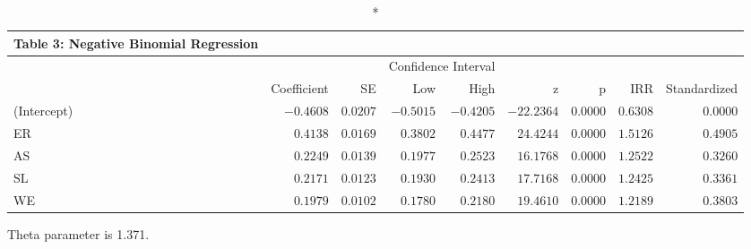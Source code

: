 \setlength{\LTpost}{0mm}
\begin{longtable}{l|rrrrrrrr}
\caption*{
{\large Table 3: Negative Binomial Regression}
} \\ 
\toprule
\multicolumn{1}{l}{} &  &  & \multicolumn{2}{c}{Confidence Interval} &  &  &  &  \\ 
\cmidrule(lr){4-5}
\multicolumn{1}{l}{} & Coefficient & SE & Low & High & z & p & IRR & Standardized \\ 
\midrule
(Intercept) & $-0.4608$ & $0.0207$ & $-0.5015$ & $-0.4205$ & $-22.2364$ & $0.0000$ & $0.6308$ & $0.0000$ \\ 
ER & $0.4138$ & $0.0169$ & $0.3802$ & $0.4477$ & $24.4244$ & $0.0000$ & $1.5126$ & $0.4905$ \\ 
AS & $0.2249$ & $0.0139$ & $0.1977$ & $0.2523$ & $16.1768$ & $0.0000$ & $1.2522$ & $0.3260$ \\ 
SL & $0.2171$ & $0.0123$ & $0.1930$ & $0.2413$ & $17.7168$ & $0.0000$ & $1.2425$ & $0.3361$ \\ 
WE & $0.1979$ & $0.0102$ & $0.1780$ & $0.2180$ & $19.4610$ & $0.0000$ & $1.2189$ & $0.3803$ \\ 
\bottomrule
\end{longtable}
\begin{minipage}{\linewidth}
Theta parameter is 1.371.\\
\end{minipage}

